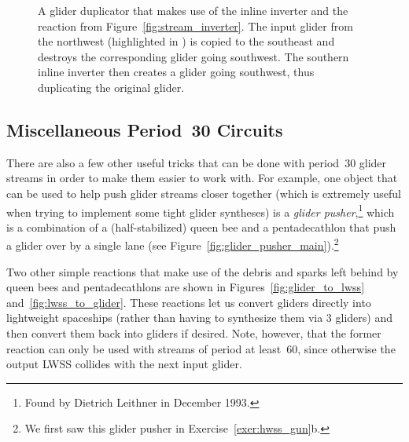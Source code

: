 \begin{figure}[!htb]
	\centering
	\caption{A glider duplicator that makes use of the inline inverter and the reaction from Figure~\ref{fig:stream_inverter}. The input glider from the northwest (highlighted in ) is copied to the southeast and destroys the corresponding glider going southwest. The southern inline inverter then creates a glider going southwest, thus duplicating the original glider.}\label{fig:glider_duplicator}
\end{figure}


\subsection{Miscellaneous Period~30 Circuits}\label{sec:p30_misc_circuits}

There are also a few other useful tricks that can be done with period~$30$ glider streams in order to make them easier to work with. For example, one object that can be used to help push glider streams closer together (which is extremely useful when trying to implement some tight glider syntheses) is a \emph{glider pusher},\footnote{Found by Dietrich Leithner in December 1993.} which is a combination of a (half-stabilized) queen bee and a pentadecathlon that push a glider over by a single lane (see Figure~\ref{fig:glider_pusher_main}).\footnote{We first saw this glider pusher in Exercise~\ref{exer:hwss_gun}b.}

Two other simple reactions that make use of the debris and sparks left behind by queen bees and pentadecathlons are shown in Figures~\ref{fig:glider_to_lwss} and~\ref{fig:lwss_to_glider}. These reactions let us convert gliders directly into lightweight spaceships (rather than having to synthesize them via $3$ gliders) and then convert them back into gliders if desired. Note, however, that the former reaction can only be used with streams of period at least~$60$, since otherwise the output LWSS collides with the next input glider.

